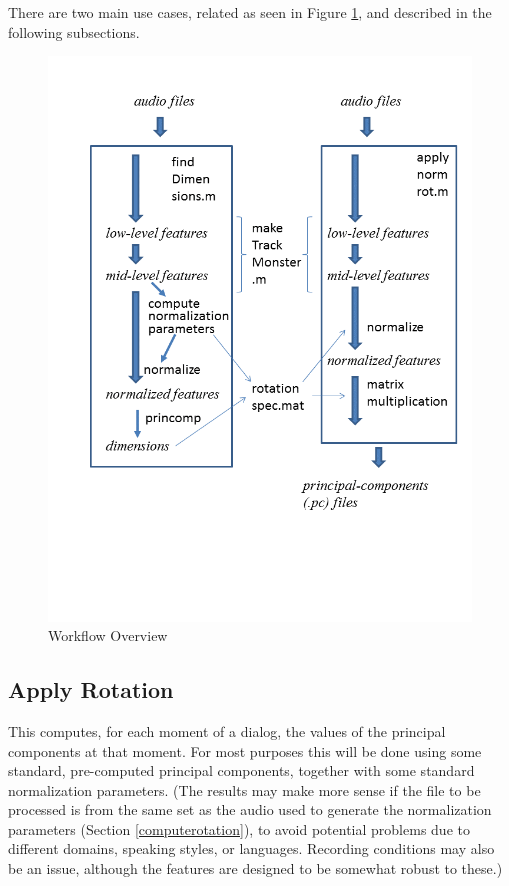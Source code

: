 \documentclass[11pt]{article}
\begin{document}
There are two main use cases, related as seen in Figure \ref{diagram},
and described in the following subsections.

\begin{figure}[tp]
 \centerline{ 
 \includegraphics[width=11.4cm, trim = 0.cm 4.3cm 0cm 1.5cm, clip=true]{workflow-overview}
}
\caption{Workflow Overview}
\label{diagram}
\end{figure}


\subsection{Apply Rotation}    \label{applynormrot}
 
This computes, for each moment of a dialog, the values of the
principal components at that moment.  For most purposes this will be
done using some standard, pre-computed principal components, together
with some standard normalization parameters.  (The results may make
more sense if the file to be processed is from the same set as the
audio used to generate the normalization parameters (Section
\ref{computerotation}), to avoid potential problems due to
different domains, speaking styles, or languages.  Recording
conditions may also be an issue, although the features are designed to
be somewhat robust to these.)
\end{document}
